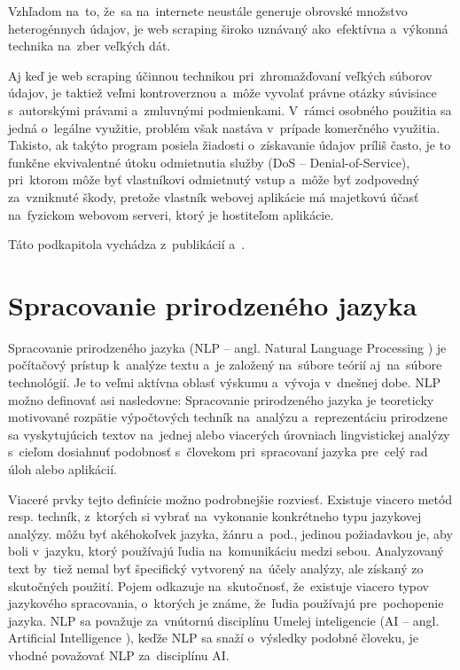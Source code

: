 Vzhľadom na~to, že~sa na~internete neustále generuje obrovské množstvo heterogénnych údajov, je web scraping široko uznávaný ako~efektívna a~výkonná technika na~zber veľkých dát. 

Aj keď je web scraping účinnou technikou pri~zhromažďovaní veľkých súborov údajov, je taktiež veľmi kontroverznou a~môže vyvolať právne otázky súvisiace s~autorskými právami a~zmluvnými podmienkami. V~rámci osobného použitia sa jedná o~legálne využitie,  problém však nastáva v~prípade komerčného využitia. Takisto, ak takýto program posiela žiadosti o~získavanie údajov príliš často, je to funkčne ekvivalentné útoku odmietnutia služby (DoS -- Denial-of-Service), pri~ktorom môže byť vlastníkovi odmietnutý vstup a~môže byť zodpovedný za~vzniknuté škody, pretože vlastník webovej aplikácie má majetkovú účasť na~fyzickom webovom serveri, ktorý je hostiteľom aplikácie.

Táto podkapitola vychádza z~publikácií \cite{Zhao:2017} a~\cite{Sirisuriya:2015}.


\section{Spracovanie prirodzeného jazyka}

Spracovanie prirodzeného jazyka (NLP -- angl. Natural Language Processing ) je počítačový prístup k~analýze textu a~je založený na~súbore teórií aj~na~súbore technológií. Je to veľmi aktívna oblasť výskumu a~vývoja v~dnešnej dobe. NLP možno definovať asi nasledovne: Spracovanie prirodzeného jazyka je teoreticky motivované rozpätie výpočtových techník na~analýzu a~reprezentáciu prirodzene sa vyskytujúcich textov na~jednej alebo viacerých úrovniach lingvistickej analýzy s~cieľom dosiahnuť podobnosť s~človekom pri~spracovaní jazyka pre~celý rad úloh alebo aplikácií.

Viaceré prvky tejto definície možno podrobnejšie rozviesť. Existuje viacero metód resp. techník, z~ktorých si vybrať na~vykonanie konkrétneho typu jazykovej analýzy.  môžu byť akéhokoľvek jazyka, žánru a~pod., jedinou požiadavkou je, aby boli v~jazyku, ktorý používajú ľudia na~komunikáciu medzi sebou. Analyzovaný text by~tiež nemal byť špecifický vytvorený na~účely analýzy, ale získaný zo skutočných použití. Pojem  odkazuje na~skutočnosť, že~existuje viacero typov jazykového spracovania, o~ktorých je známe, že~ľudia používajú pre~pochopenie jazyka. NLP sa považuje za~vnútornú disciplínu Umelej inteligencie (AI -- angl. Artificial Intelligence ), keďže NLP sa snaží o~výsledky podobné človeku, je vhodné považovať NLP za~disciplínu AI.


